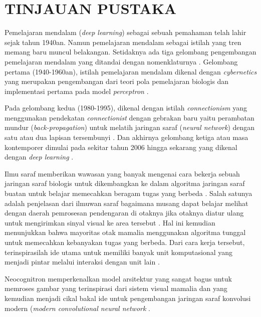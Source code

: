 \chapter{TINJAUAN PUSTAKA}\label{tipus}
Pemelajaran mendalam (\emph{deep learning}) sebagai sebuah pemahaman telah lahir sejak tahun 1940an. Namun pemelajaran mendalam sebagai istilah yang tren memang baru muncul belakangan. Setidaknya ada tiga gelombang pengembangan pemelajaran mendalam yang ditandai dengan nomenklaturnya \citep{goodfellow_bengio_courville_2016}. Gelombang pertama (1940-1960an), istilah pemelajaran mendalam dikenal dengan \emph{cybernetics} yang merupakan pengembangan dari teori pola pemelajaran biologis \citep{mcculloch_pitts_1943, morris_1999} dan implementasi pertama pada model \emph{perceptron} \citep{rosenblatt_1958}.

Pada gelombang kedua (1980-1995), dikenal dengan istilah \emph{connectionism} yang menggunakan pendekatan \emph{connectionist} dengan gebrakan baru yaitu perambatan mundur (\emph{back-propagation}) untuk melatih jaringan saraf (\emph{neural network}) dengan satu atau dua lapisan tersembunyi \citep{rumelhart_hinton_williams_1986}. Dan akhirnya gelombang ketiga atau masa kontemporer dimulai pada sekitar tahun 2006 hingga sekarang yang dikenal dengan \emph{deep learning} \citep{hinton_osindero_teh_2006, NIPS2006_5da713a6}.

Ilmu saraf memberikan wawasan yang banyak mengenai cara bekerja sebuah jaringan saraf biologis untuk dikembangkan ke dalam algoritma jaringan saraf buatan untuk belajar memecahkan beragam tugas yang berbeda \citep{goodfellow_bengio_courville_2016}. Salah satunya adalah penjelasan dari ilmuwan saraf bagaimana musang dapat belajar melihat dengan daerah pemrosesan pendengaran di otaknya jika otaknya diatur ulang untuk mengirimkan sinyal visual ke area tersebut \citep{von_melchner_pallas_sur_2000}. Hal ini kemudian menunjukkan bahwa mayoritas otak mamalia menggunakan algoritma tunggal untuk memecahkan kebanyakan tugas yang berbeda. Dari cara kerja tersebut, terinspirasilah ide utama untuk memiliki banyak unit komputasional yang menjadi pintar melalui interaksi dengan unit lain \citep{goodfellow_bengio_courville_2016}.

Neocognitron \citep{fukushima_1980} memperkenalkan model arsitektur yang sangat bagus untuk memroses gambar yang terinspirasi dari sistem visual mamalia dan yang kemudian menjadi cikal bakal ide untuk pengembangan jaringan saraf konvolusi modern (\emph{modern convolutional neural network} \citep{726791, lecun_kavukcuoglu_farabet_2010}.

